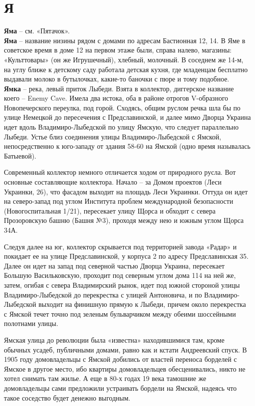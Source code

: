 \chapter*{Я}

\textbf{Яма} – см. «Пятачок».\\

\textbf{Яма} – название низины рядом с домами по адресам Бастионная 12, 14. В Яме в советское время в доме 12 на первом этаже были, справа налево, магазины: «Культтовары» (он же Игрушечный), хлебный, молочный. В соседнем же 14-м, на углу ближе к детскому саду работала детская кухня, где младенцам бесплатно выдавали молоко в бутылочках, какие-то баночки с пюре и тому подобное.\\

\textbf{Ямка} – река, левый приток Лыбеди. Взята в коллектор, диггерское название коего – Enemy Cave. Имела два истока, оба в районе отрогов V-образного Новопечерского переулка, под горой. Сходясь, общим руслом речка шла бы по улице Немецкой до пересечения с Предславинской, и далее мимо Дворца Украина идет вдоль Владимиро-Лыбедской по улицу Ямскую, что следует параллельно Лыбеди. Устье близ соединения улицы Владимиро-Лыбедской с Ямской, непосредственно к юго-западу от здания 58-60 на Ямской (одно время называлась Батыевой).

Современный коллектор немного отличается ходом от природного русла. Вот основные составляющие коллектора. Начало – за Домом проектов (Леси Украинки, 26), что фасадом выходит на площадь Леси Украинки. Оттуда он идет на северо-запад под углом Института проблем международной безопасности (Новогоспитальная 1/21), пересекает улицу Щорса и обходит с севера Прозоровскую башню (Башня №3), проходя между нею и южным углом Щорса 34А. 

Следуя далее на юг, коллектор скрывается под территорией завода «Радар» и покидает ее на улице Предславинской, у корпуса 2 по адресу Предславинская 35. Далее он идет на запад под северной частью Дворца Украина, пересекает Большую Васильковскую, проходит под северным углом дома 114 на ней же, затем, огибая с севера Владимирский рынок, идет под южной стороной улицы Владимиро-Лыбедской до перекрестка с улицей Антоновича, и по Владимиро-Лыбедской выходит на финишную прямую к Лыбеди, причем около перекрестка с Ямской течет точно под зеленым бульварчиком между обеими шоссейными полотнами улицы.

Ямская улица до революции была «известна» находившимися там, кроме обычных усадеб, публичными домами, равно как и кстати Андреевский спуск. В 1905 году домовладельцы с Ямской добились от властей переноса борделей с Ямское в другое место, ибо квартиры домовладельцев обесценивались, никто не хотел снимать там жилье. А еще в 80-х годах 19 века тамошние же домовладельцы сами предложили устраивать бордели на Ямской, надеясь что такое соседство будет денежно выгодным.

